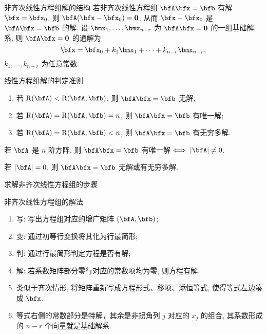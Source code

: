 \begin{frame}{非齐次线性方程组解的结构}
	\onslide<+->
	若非齐次线性方程组 $\bfA\bfx=\bfb$ 有解 $\bfx=\bfx_0$,
	则 $\bfA(\bfx-\bfx_0)={\bf0}$.
	\onslide<+->
	从而 $\bfx-\bfx_0$ 是 $\bfA\bfx={\bfb}$ 的解.
	\onslide<+->
	设 $\bmx_1,\dots,\bmx_{n-r}$ 为 $\bfA\bfx={\bf0}$ 的一组基础解系, 则 $\bfA\bfx={\bf0}$ 的通解为
	\[\bfx=\bfx_0+k_1\bmx_1+\cdots+k_{n-r}\bmx_{n-r},\]
	$k_1,\dots,k_{n-r}$ 为任意常数.

	\onslide<+->
	\begin{algorithm}{线性方程组解的判定准则}
		\begin{enumerate}
			\item 若 $\rank(\bfA)<\rank(\bfA,\bfb)$, 则 $\bfA \bfx=\bfb$ 无解;
			\item 若 $\rank(\bfA)=\rank(\bfA,\bfb)=n$, 则 $\bfA \bfx=\bfb$ 有唯一解;
			\item 若 $\rank(\bfA)=\rank(\bfA,\bfb)<n$, 则 $\bfA \bfx=\bfb$ 有无穷多解.
		\end{enumerate}
	\end{algorithm}
	\onslide<+->
	\begin{corollary}
		若 $\bfA$ 是 $n$ 阶方阵, 则 $\bfA\bfx=\bfb$ 有唯一解$\iff|\bfA|\neq0$.
	\end{corollary}
	\onslide<+->
	若 $|\bfA|=0$, 则 $\bfA\bfx=\bfb$ 无解或有无穷多解.
\end{frame}


\begin{frame}{求解非齐次线性方程组的步骤}
	\onslide<+->
	\begin{algorithm}{非齐次线性方程组的解法}
		\begin{enumerate}
			\item 写: 写出方程组对应的增广矩阵 $(\bfA,\bfb)$;
			\item 变: 通过初等行变换将其化为行最简形;
			\item 判: 通过行最简形判定方程是否有解;
			\item 解: 若系数矩阵部分零行对应的常数项均为零, 则方程有解.
			\item 类似于齐次情形, 将矩阵重新写成方程形式、移项、添恒等式, 使得等式左边凑成 $\bfx$.
			\item 等式右侧的常数部分是特解，其余是非拐角列 $j$ 对应的 $x_j$ 的组合, 其系数形成的 $n-r$ 个向量就是基础解系.
		\end{enumerate}
	\end{algorithm}
\end{frame}


